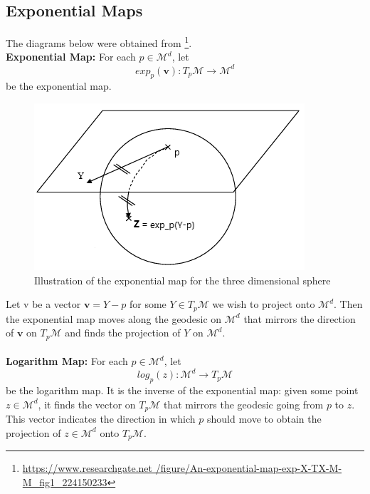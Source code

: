 \documentclass[12pt]{report}
\begin{document}
\subsection{Exponential Maps}

The diagrams below were obtained from \footnote{\url{https://www.researchgate.net
/figure/An-exponential-map-exp-X-TX-M-M_fig1_224150233}}.\\
\textbf{Exponential Map:} For each $p \in \mathcal{M}^d$, let
$$exp_p(\mathbf{v}): T_p\mathcal{M} \longrightarrow \mathcal{M}^d$$
be the exponential map. 
\begin{figure}[ht]
    \begin{center}
        \includegraphics[scale=0.8]{exp_map.PNG}
        \caption{Illustration of the exponential map 
        for the three dimensional sphere}
        \label{fig:Illustration of an Exponential Map}
    \end{center}
\end{figure}
Let v be a vector $\mathbf{v} = Y - p$ for some $Y \in T_p\mathcal{M}$ we
wish to project onto $\mathcal{M}^d$. Then the exponential map moves along
the geodesic on $\mathcal{M}^d$ that mirrors the direction of $\mathbf{v}$
on $T_p\mathcal{M}$ and finds the projection of $Y$ on $\mathcal{M}^d$.\\
\\
\textbf{Logarithm Map:} For each $p \in \mathcal{M}^d$, let
$$log_p(z): \mathcal{M}^d \longrightarrow T_p\mathcal{M}$$
be the logarithm map. 
It is the inverse of the exponential map: 
given some point $z \in \mathcal{M}^d$, it finds the 
vector on $T_p\mathcal{M}$ that mirrors the geodesic 
going from $p$ to $z$. This vector indicates the direction in which $p$
should move to obtain the projection of 
$z \in \mathcal{M}^d$ onto $T_p\mathcal{M}$.
\end{document}
